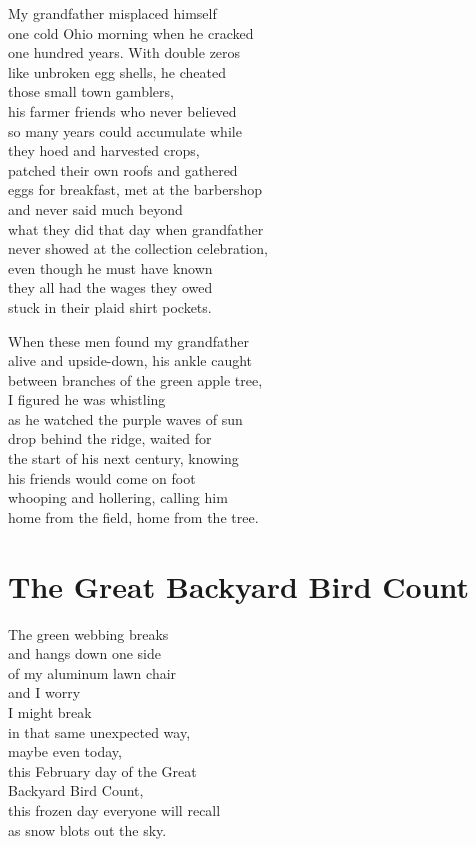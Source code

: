 \documentclass[twoside,10pt]{book}
\begin{document}
My grandfather misplaced himself\\
one cold Ohio morning when he cracked\\
one hundred years. With double zeros\\
like unbroken egg shells, he cheated\\
those small town gamblers,\\
his farmer friends who never believed\\
so many years could accumulate while\\
they hoed and harvested crops,\\
patched their own roofs and gathered\\
eggs for breakfast, met at the barbershop\\
and never said much beyond\\
what they did that day when grandfather\\
never showed at the collection celebration,\\
even though he must have known\\
they all had the wages they owed\\
stuck in their plaid shirt pockets.

When these men found my grandfather\\
alive and upside-down, his ankle caught\\
between branches of the green apple tree,\\
I figured he was whistling\\
as he watched the purple waves of sun\\
drop behind the ridge, waited for\\
the start of his next century, knowing\\
his friends would come on foot\\
whooping and hollering, calling him\\
home from the field, home from the tree.


\clearpage
\section{The Great Backyard Bird Count}

The green webbing breaks\\
and hangs down one side\\
of my aluminum lawn chair\\
and I worry\\
I might break\\
in that same unexpected way,\\
maybe even today,\\
this February day of the Great\\
Backyard Bird Count,\\
this frozen day everyone will recall\\
as snow blots out the sky.
\end{document}
